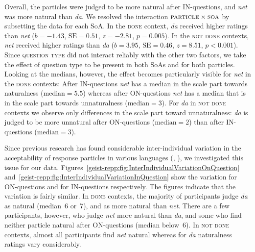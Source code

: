 \documentclass[output=paper,colorlinks,citecolor=brown]{langscibook}
\begin{document}
Overall, the particles were judged to be more natural after IN-questions, and \textit{net} was more natural than \textit{da}. We resolved the interaction $\text{\textsc{particle}}\times\text{\textsc{soa}}$ by subsetting the data for each SoA. In the \textsc{done} context, \textit{da} received higher ratings than \textit{net} ($b=-1.43$, $\text{SE}=0.51$, $z=-2.81$, $p=0.005$). In the \textsc{not done} contexts, \textit{net} received higher ratings than \textit{da} ($b=3.95$, $\text{SE}=0.46$, $z=8.51$, $p<0.001$). Since \textsc{question type} did not interact reliably with the other two factors, we take the effect of question type to be present in both SoAs and for both particles. Looking at the medians, however, the effect becomes particularly visible for \textit{net} in the \textsc{done} contexts: After IN-questions \textit{net} has a median in the scale part towards naturalness ($\text{median}=5.5$) whereas after ON-questions \textit{net} has a median that is in the scale part towards unnaturalness ($\text{median}=3$). For \textit{da} in \textsc{not done} contexts we observe only differences in the scale part toward unnaturalness: \textit{da} is judged to be more unnatural after ON-questions ($\text{median}=2$) than after IN-questions ($\text{median}=3$).

Since previous research has found considerable inter-individual variation in the acceptability of response particles in various languages (\citealt{ClausMeijerReppKrifka2017}, \citealt{ReppMeijerScherf2019}), we investigated this issue for our data. Figures~\ref{geist-repp:fig:InterIndividualVariationOnQuestion} and~\ref{geist-repp:fig:InterIndividualVariationInQuestion} show the variation for ON-questions and for IN-questions respectively. The figures indicate that the variation is fairly similar. In \textsc{done} contexts, the majority of participants judge \textit{da} as natural (median~6 or~7), and as more natural than \textit{net}. There are a few participants, however, who judge \textit{net} more natural than \textit{da}, and some who find neither particle natural after ON-questions (median below~6). In \textsc{not done} contexts, almost all participants find \textit{net} natural whereas for \textit{da} naturalness ratings vary considerably.

\end{document}
